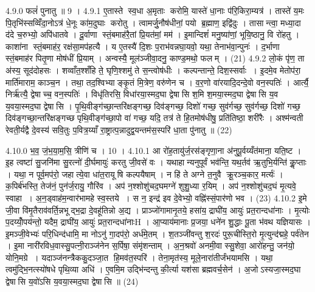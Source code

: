 4.9.0
फलं॑ पुनातु ॥ 9 ।
4.9.1
ए॒तास्ते स्व॒धा अ॒मृताः करोमि॒ यास्ते॑ धा॒नाः प॑रि॒किरा॒म्यत्र॑ । तास्ते॑ य॒मः पि॒तृभि॑स्सव्विँदा॒नोऽत्र॑ धे॒नूः का॑म॒दुघाः करोतु । त्वामर्जु॒नौष॑धीनां॒ पयो ब्र॒ह्माण॒ इद्वि॑दुः । तासान्त्वा॒ मध्या॒दा द॑दे च॒रुभ्यो॒ अपि॑धातवे । दू॒र्वाणा स्तं॒बमाह॑रै॒तां प्रि॒यत॑मां॒ मम॑ । इ॒मान्दिशं॑ मनु॒ष्या॑णां॒ भूयि॒ष्ठानु॒ वि रो॑हतु । काशा॑ना स्तं॒बमाह॑र॒ रक्ष॑सा॒मप॑हत्यै । य ए॒तस्यै॑ दि॒शः प॒राभ॑वन्नघा॒यवो॒ यथा॒ तेनाभ॑वा॒न्पुनः॑ । द॒र्भाणा स्तं॒बमाह॑र पितृ॒णा मोष॑धीं प्रि॒याम् । अन्वस्यै॒ मूल॑ञ्जीवा॒दनु॒ काण्ड॒मथो॒ फलम् । (21)
4.9.2
लो॒कं पृ॑ण॒ ता अ॑स्य॒ सूद॑दोहसः । शव्वाँत॒श्शँहि ते॒ घृणि॒श्शमु॑ ते स॒न्त्वोष॑धीः । कल्पन्तान्ते॒ दिश॒स्सर्वाः । इ॒दमे॒व मेतोप॑रा॒ मार्ति॑माराम॒ काञ्च॒न । तथा॒ तद॒श्विभ्याङ्कृ॒तं मि॒त्रेण॒ वरु॑णेन च । व॒र॒णो वा॑रयादि॒दन्दे॒वो वन॒स्पतिः॑ । आर्त्यै॒ निर्\mbox{}ऋ॑त्यै॒ द्वेषाच्च॒ वन॒स्पतिः॑ । विधृ॑तिरसि॒ विधा॑रया॒स्मद॒घा द्वेषासि श॒मि श॒मया॒स्मद॒घा द्वेषासि य॒व य॒वया॒स्मद॒घा द्वेषासि । पृ॒थि॒वीङ्ग॑च्छा॒न्तरि॑क्षङ्गच्छ॒ दिव॑ङ्गच्छ॒ दिशो॑ गच्छ॒ सुव॑र्गच्छ॒ सुव॑र्गच्छ॒ दिशो॑ गच्छ॒ दिव॑ङ्गच्छा॒न्तरि॑क्षङ्गच्छ पृथि॒वीङ्ग॑च्छा॒पो वा॑ गच्छ॒ यदि॒ तत्र॑ ते हि॒तमोष॑धीषु॒ प्रति॑तिष्ठा॒ शरी॑रैः । अश्म॑न्वती रेवती॒र्यद्वै दे॒वस्य॑ सवि॒तुः प॒वित्र॒य्याँ रा॒ष्ट्रात्प॒न्नादुद्व॒यन्तम॑स॒स्परि॑ धा॒ता पु॑नातु ॥ (22)
\anuvakamend

4.10.0
भ॒व॒ जं॒भ॒या॒म॒सि॒ त्रीणि॑ च । 10 ।
4.10.1
आ रो॑ह॒तायु॑र्ज॒रस॑ङ्गृणा॒ना अ॑नुपू॒र्वय्यँत॑माना॒ यति॒ष्ट । इ॒ह त्वष्टा॑ सु॒जनि॑मा सु॒रत्नो॑ दी॒र्घमायुः॑ करतु जी॒वसे॑ वः । यथाहान्यनुपूर्वं भव॑न्ति॒ यथ॒र्तव॑ ऋ॒तुभि॒र्यन्ति॑ कॢ॒प्ताः । यथा॒ न पूर्व॒मप॑रो॒ जहात्ये॒वा धा॑त॒रायूषि कल्पयैषाम् । न हि॑ ते अग्ने त॒नुवै क्रू॒रञ्च॒कार॒ मर्त्यः॑ । क॒पिर्ब॑भस्ति॒ तेज॑नं॒ पुन॑र्ज॒रायु॒ गौरि॑व । अप॑ न॒श्शोशु॑चद॒घमग्ने॑ शुशु॒ध्या र॒यिम् । अप॑ न॒श्शोशु॑चद॒घं मृ॒त्यवे॒ स्वाहा । अ॒न॒ड्वाह॑म॒न्वार॑भामहे स्व॒स्तये । स न॒ इन्द्र॑ इव दे॒वेभ्यो॒ वह्नि॑स्सं॒पार॑णो भव । (23)
4.10.2
इ॒मे जी॒वा वि॑मृ॒तैराव॑वर्ति॒न्नभूद्भ॒द्रा दे॒वहू॑तिन्नो अ॒द्य । प्राञ्जो॑गामानृ॒तये॒ हसा॑य॒ द्राघी॑य॒ आयुः॑ प्रत॒रान्दधा॑नाः । मृ॒त्योः प॒दय्योँ॒पय॑न्तो॒ यदैम॒ द्राघी॑य॒ आयुः॑ प्रत॒रान्दधा॑नाःH । आ॒प्याय॑मानाः प्र॒जया॒ धने॑न शु॒द्धाः पू॒ता भ॑वथ यज्ञियासः । इ॒मञ्जी॒वेभ्यः॑ परि॒धिन्द॑धामि॒ मा नोऽनु॑ गा॒दप॑रो॒ अर्ध॑मे॒तम् । श॒तञ्जी॑वन्तु श॒रदः॑ पुरू॒चीस्ति॒रो मृ॒त्युन्द॑द्महे॒ पर्व॑तेन । इ॒मा नारी॑रविध॒वास्सु॒पत्नी॒राञ्ज॑नेन स॒र्पिषा॒ संमृ॑शन्ताम् । अ॒न॒श्रवो॑ अनमी॒वा स्सु॒शेवा॒ आरो॑हन्तु॒ जन॑यो॒ योनि॒मग्रे । यदाञ्ज॑नन्त्रैककु॒दञ्जा॒त हि॒मव॑त॒स्परि॑ । तेना॒मृत॑स्य॒ मूले॒नारा॑तीर्जंभयामसि । यथा॒ त्वमु॑द्भि॒नत्स्यो॑षधे पृथि॒व्या अधि॑ । ए॒वमि॒म उद्भि॑न्दन्तु की॒र्त्या यश॑सा ब्रह्मवर्च॒सेन॑ । अ॒जोऽस्यजा॒स्मद॒घा द्वेषासि य॒वो॑ऽसि य॒वया॒स्मद॒घा द्वेषासि ॥ (24)
\anuvakamend

